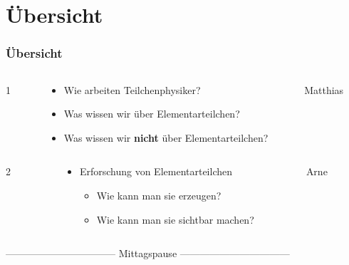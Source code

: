 \documentclass{beamer}
\begin{document}
\section{\"Ubersicht}
\begin{frame}
  \frametitle{\"Ubersicht}
  \begin{columns}
    \begin{column}{0.05\textwidth}
      \centering
      \alert{\Huge 1}
    \end{column}
    \begin{column}{0.68\textwidth}
      \begin{itemize}
      \item Wie arbeiten Teilchenphysiker?
      \item Was wissen wir \"uber Elementarteilchen?
      \item Was wissen wir \textbf{nicht} \"uber Elementarteilchen?
      \end{itemize}
    \end{column}
    \begin{column}{0.27\textwidth}
      \centering
      \alert{Matthias}
    \end{column}
  \end{columns}
  \vskip0.5cm
  \begin{columns}
    \begin{column}{0.05\textwidth}
      \centering
      \alert{\Huge 2}
    \end{column}
    \begin{column}{0.68\textwidth}
      \begin{itemize}
      \item Erforschung von Elementarteilchen
        \begin{itemize}
        \item Wie kann man sie erzeugen?
        \item Wie kann man sie sichtbar machen?
        \end{itemize}
      \end{itemize}
    \end{column}
    \begin{column}{0.27\textwidth}
      \centering
      \alert{Arne}
    \end{column}
  \end{columns}
  \begin{center}
    ---------------------------------   Mittagspause   ---------------------------------
  \end{center}

\end{frame}
\end{document}

